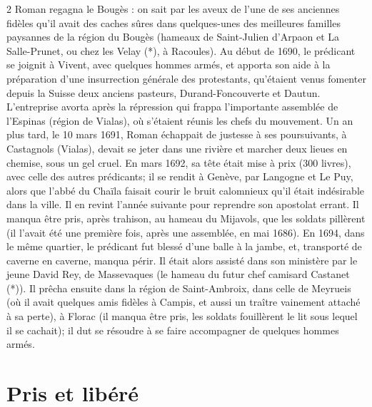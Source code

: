{\begin{multicols}{2}
Roman regagna le Bougès : on sait par les aveux de l’une de ses anciennes fidèles qu’il avait des caches sûres dans quelques-unes des meilleures familles paysannes de la région du Bougès (hameaux de Saint-Julien d’Arpaon et La Salle-Prunet, ou chez les Velay (*), à Racoules). Au début de 1690, le prédicant se joignit à Vivent, avec quelques hommes armés, et apporta son aide à la préparation d’une insurrection générale des protestants, qu’étaient venus fomenter depuis la Suisse deux anciens pasteurs, Durand-Foncouverte et Dautun. L’entreprise avorta après la répression qui frappa l’importante assemblée de l’Espinas (région de Vialas), où s’étaient réunis les chefs du mouvement. Un an plus tard, le 10 mars 1691, Roman échappait de justesse à ses poursuivants, à Castagnols (Vialas), devait se jeter dans une rivière et marcher deux lieues en chemise, sous un gel cruel. En mars 1692, sa tête était mise à prix (300 livres), avec celle des autres prédicants; il se rendit à Genève, par Langogne et Le Puy, alors que l’abbé du Chaïla faisait courir le bruit calomnieux qu’il était indésirable dans la ville. Il en revint l’année suivante pour reprendre son apostolat errant. Il manqua être pris, après trahison, au hameau du Mijavols, que les soldats pillèrent (il l’avait été une première fois, après une assemblée, en mai 1686). En 1694, dans le même quartier, le prédicant fut blessé d’une balle à la jambe, et, transporté de caverne en caverne, manqua périr. Il était alors assisté dans son ministère par le jeune David Rey, de Massevaques (le hameau du futur chef camisard Castanet (*)). Il prêcha ensuite dans la région de Saint-Ambroix, dans celle de Meyrueis (où il avait quelques amis fidèles à Campis, et aussi un traître vainement attaché à sa perte), à Florac (il manqua être pris, les soldats fouillèrent le lit sous lequel il se cachait); il dut se résoudre à se faire accompagner de quelques hommes armés.

\section*{Pris et libéré}


\end{multicols}}
